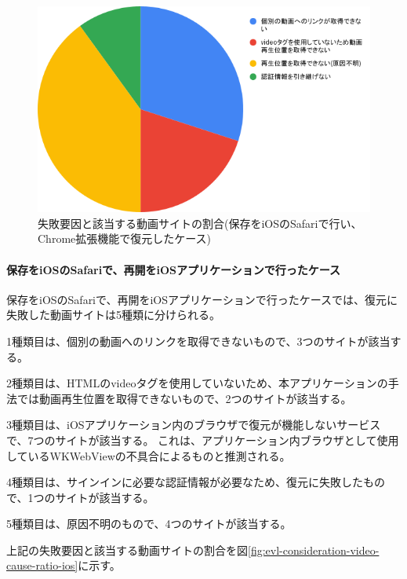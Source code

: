 \begin{figure}[htbp]
  \caption{失敗要因と該当する動画サイトの割合(保存をiOSのSafariで行い、Chrome拡張機能で復元したケース)}
  \label{fig:evl-consideration-video-cause-ratio-ios-chrome}
  \begin{center}
    \includegraphics[bb=0 0 600 371,width=15cm]{img/060_evaluation/consideration/video/cause-ratio-ios-chrome.pdf}
  \end{center}
\end{figure}

\paragraph{保存をiOSのSafariで、再開をiOSアプリケーションで行ったケース}
保存をiOSのSafariで、再開をiOSアプリケーションで行ったケースでは、復元に失敗した動画サイトは5種類に分けられる。

1種類目は、個別の動画へのリンクを取得できないもので、3つのサイトが該当する。

2種類目は、HTMLのvideoタグを使用していないため、本アプリケーションの手法では動画再生位置を取得できないもので、2つのサイトが該当する。

3種類目は、iOSアプリケーション内のブラウザで復元が機能しないサービスで、7つのサイトが該当する。
これは、アプリケーション内ブラウザとして使用しているWKWebViewの不具合によるものと推測される。

4種類目は、サインインに必要な認証情報が必要なため、復元に失敗したもので、1つのサイトが該当する。

5種類目は、原因不明のもので、4つのサイトが該当する。

上記の失敗要因と該当する動画サイトの割合を図\ref{fig:evl-consideration-video-cause-ratio-ios}に示す。

